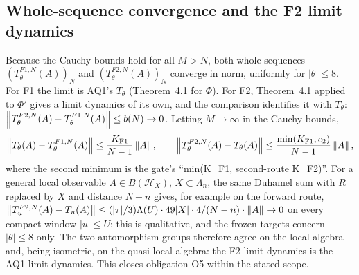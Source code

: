 \subsection{Whole-sequence convergence and the F2 limit dynamics}
\label{sec:ba2-limit}
Because the Cauchy bounds hold for all $M>N$, both whole sequences
$(T^{F1,N}_\theta(A))_N$ and $(T^{F2,N}_\theta(A))_N$ converge in norm,
uniformly for $|\theta|\le8$. For F1 the limit is AQ1's $T_\theta$
(Theorem~4.1 for $\Phi$). For F2, Theorem~4.1 applied to $\Phi'$ gives a limit
dynamics of its own, and the comparison identifies it with $T_\theta$:
$\left\lVert T^{F2,N}_\theta(A)-T^{F1,N}_\theta(A)\right\rVert\le b(N)\to0$. Letting
$M\to\infty$ in the Cauchy bounds,
\begin{equation}
 \left\lVert T_\theta(A)-T^{F1,N}_\theta(A)\right\rVert\le\frac{K_{\rm F1}}{N-1}\left\lVert A\right\rVert,\qquad
 \left\lVert T^{F2,N}_\theta(A)-T_\theta(A)\right\rVert\le\frac{\min(K_{\rm F1},c_2)}{N-1}\left\lVert A\right\rVert,
 \label{eq:ba2-limit}
\end{equation}
where the second minimum is the gate's ``min(K\_F1, second-route K\_F2)''. For
a general local observable $A\in B(\mathcal H_X)$, $X\subset\Lambda_n$, the
same Duhamel sum with $R$ replaced by $X$ and distance $N-n$ gives, for
example on the forward route,
$\left\lVert T^{F2,N}_u(A)-T_u(A)\right\rVert\le(|\tau|/3)\Lambda(U)\cdot49|X|\cdot
4/(N-n)\cdot\left\lVert A\right\rVert\to0$ on every compact window $|u|\le U$; this is
qualitative, and the frozen targets concern $|\theta|\le8$ only. The two
automorphism groups therefore agree on the local algebra and, being
isometric, on the quasi-local algebra: the F2 limit dynamics is the AQ1 limit
dynamics. This closes obligation O5 within the stated scope.

